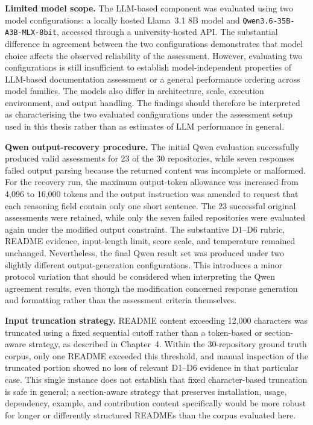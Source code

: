 \textbf{Limited model scope.}
The LLM-based component was evaluated using two model configurations:
a locally hosted Llama~3.1 8B model and
\texttt{Qwen3.6-35B-A3B-MLX-8bit}, accessed through a
university-hosted API. The substantial difference in agreement between
the two configurations demonstrates that model choice affects the
observed reliability of the assessment. However, evaluating two
configurations is still insufficient to establish model-independent
properties of LLM-based documentation assessment or a general
performance ordering across model families. The models also differ in
architecture, scale, execution environment, and output handling.
The findings should therefore be interpreted as characterising the
two evaluated configurations under the assessment setup used in this
thesis rather than as estimates of LLM performance in general.

\textbf{Qwen output-recovery procedure.}
The initial Qwen evaluation successfully produced valid assessments
for 23 of the 30 repositories, while seven responses failed output
parsing because the returned content was incomplete or malformed.
For the recovery run, the maximum output-token allowance was increased
from 4{,}096 to 16{,}000 tokens and the output instruction was amended
to request that each reasoning field contain only one short sentence.
The 23 successful original assessments were retained, while only the
seven failed repositories were evaluated again under the modified
output constraint. The substantive D1--D6 rubric, README evidence,
input-length limit, score scale, and temperature remained unchanged.
Nevertheless, the final Qwen result set was produced under two
slightly different output-generation configurations. This introduces
a minor protocol variation that should be considered when interpreting
the Qwen agreement results, even though the modification concerned
response generation and formatting rather than the assessment
criteria themselves.

\textbf{Input truncation strategy.} README content exceeding
12{,}000 characters was truncated using a fixed sequential cutoff
rather than a token-based or section-aware strategy, as described in
Chapter~4. Within the 30-repository ground truth corpus, only one
README exceeded this threshold, and manual inspection of the
truncated portion showed no loss of relevant D1--D6 evidence in that
particular case. This single instance does not establish that fixed
character-based truncation is safe in general; a section-aware
strategy that preserves installation, usage, dependency, example, and
contribution content specifically would be more robust for longer
or differently structured READMEs than the corpus evaluated here.

